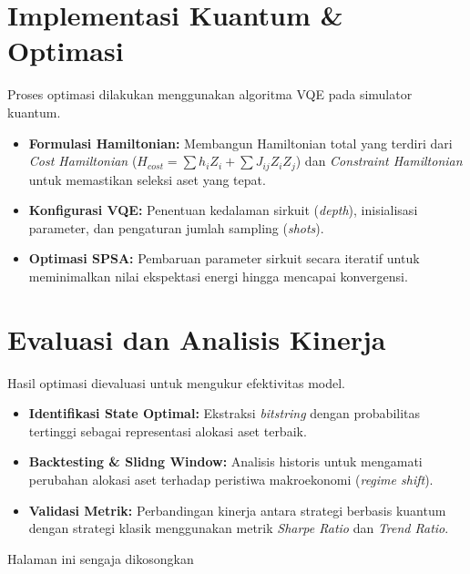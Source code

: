 \section{Implementasi Kuantum \& Optimasi}
Proses optimasi dilakukan menggunakan algoritma VQE pada simulator kuantum.
\begin{itemize}
    \item \textbf{Formulasi Hamiltonian:} Membangun Hamiltonian total yang terdiri dari \textit{Cost Hamiltonian} ($H_{cost} = \sum h_i Z_i + \sum J_{ij} Z_i Z_j$) dan \textit{Constraint Hamiltonian} untuk memastikan seleksi aset yang tepat.
    \item \textbf{Konfigurasi VQE:} Penentuan kedalaman sirkuit (\textit{depth}), inisialisasi parameter, dan pengaturan jumlah sampling (\textit{shots}).
    \item \textbf{Optimasi SPSA:} Pembaruan parameter sirkuit secara iteratif untuk meminimalkan nilai ekspektasi energi hingga mencapai konvergensi.
\end{itemize}

\section{Evaluasi dan Analisis Kinerja}
Hasil optimasi dievaluasi untuk mengukur efektivitas model.
\begin{itemize}
    \item \textbf{Identifikasi State Optimal:} Ekstraksi \textit{bitstring} dengan probabilitas tertinggi sebagai representasi alokasi aset terbaik.
    \item \textbf{Backtesting \& Slidng Window:} Analisis historis untuk mengamati perubahan alokasi aset terhadap peristiwa makroekonomi (\textit{regime shift}).
    \item \textbf{Validasi Metrik:} Perbandingan kinerja antara strategi berbasis kuantum dengan strategi klasik menggunakan metrik \textit{Sharpe Ratio} dan \textit{Trend Ratio}.
\end{itemize}

\newpage
\thispagestyle{empty}
\vspace*{\fill}
    \begin{center}
	Halaman ini sengaja dikosongkan
    \end{center}
\vspace*{\fill}
\pagebreak
